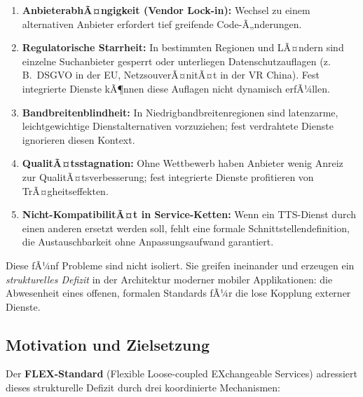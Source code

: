 ﻿\documentclass[a4paper,12pt]{article}
\theoremstyle{definition}
\begin{document}
\begin{enumerate}
    \item \textbf{AnbieterabhÃ¤ngigkeit (Vendor Lock-in):} Wechsel zu einem alternativen Anbieter erfordert tief greifende Code-Ã„nderungen.
    \item \textbf{Regulatorische Starrheit:} In bestimmten Regionen und LÃ¤ndern sind einzelne Suchanbieter gesperrt oder unterliegen Datenschutzauflagen (z.\,B.\ DSGVO in der EU, NetzsouverÃ¤nitÃ¤t in der VR China). Fest integrierte Dienste kÃ¶nnen diese Auflagen nicht dynamisch erfÃ¼llen.
    \item \textbf{Bandbreitenblindheit:} In Niedrigbandbreitenregionen sind latenzarme, leichtgewichtige Dienstalternativen vorzuziehen; fest verdrahtete Dienste ignorieren diesen Kontext.
    \item \textbf{QualitÃ¤tsstagnation:} Ohne Wettbewerb haben Anbieter wenig Anreiz zur QualitÃ¤tsverbesserung; fest integrierte Dienste profitieren von TrÃ¤gheitseffekten.
    \item \textbf{Nicht-KompatibilitÃ¤t in Service-Ketten:} Wenn ein TTS-Dienst durch einen anderen ersetzt werden soll, fehlt eine formale Schnittstellendefinition, die Austauschbarkeit ohne Anpassungsaufwand garantiert.
\end{enumerate}

Diese fÃ¼nf Probleme sind nicht isoliert. Sie greifen ineinander und erzeugen ein \emph{strukturelles Defizit} in der Architektur moderner mobiler Applikationen: die Abwesenheit eines offenen, formalen Standards fÃ¼r die lose Kopplung externer Dienste.

\subsection{Motivation und Zielsetzung}

Der \textbf{FLEX-Standard} (Flexible Loose-coupled EXchangeable Services) adressiert dieses strukturelle Defizit durch drei koordinierte Mechanismen:
\end{document}
